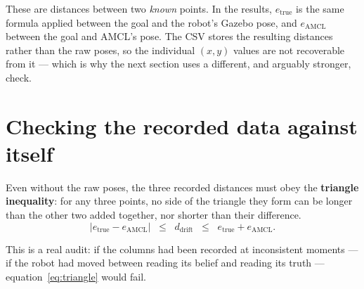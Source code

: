 \documentclass[11pt,a4paper]{report}
\newcommand{\term}[1]{\textcolor{rust}{\textbf{#1}}}
\begin{document}
These are distances between two \emph{known} points. In the results,
$e_{\text{true}}$ is the same formula applied between the goal and the robot's
Gazebo pose, and $e_{\text{AMCL}}$ between the goal and AMCL's pose. The CSV
stores the resulting distances rather than the raw poses, so the individual
$(x,y)$ values are not recoverable from it --- which is why the next section
uses a different, and arguably stronger, check.

\section{Checking the recorded data against itself}

Even without the raw poses, the three recorded distances must obey the
\term{triangle inequality}: for any three points, no side of the triangle they
form can be longer than the other two added together, nor shorter than their
difference.
\begin{equation}
\bigl| e_{\text{true}} - e_{\text{AMCL}} \bigr|
\;\;\le\;\; d_{\text{drift}} \;\;\le\;\;
e_{\text{true}} + e_{\text{AMCL}} .
\label{eq:triangle}
\end{equation}

This is a real audit: if the columns had been recorded at inconsistent moments
--- if the robot had moved between reading its belief and reading its truth ---
equation~\eqref{eq:triangle} would fail.
\end{document}

